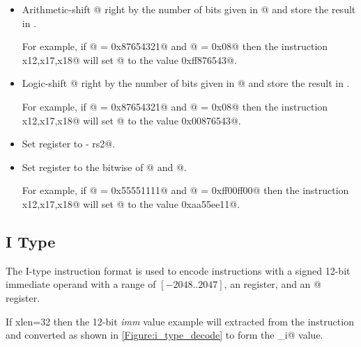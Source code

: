 \begin{itemize}
\item{}
\label{insn:sra}

Arithmetic-shift @ right by the number of bits given in @ and
store the result in \verb@rd@.

For example, if @ = \verb@0x87654321@ and @ = \verb@0x08@
then the instruction \verb@sra x12,x17,x18@ will set @ to the
value \verb@0xff876543@.

\item{}
\label{insn:srl}

Logic-shift @ right by the number of bits given in @ and
store the result in \verb@rd@.

For example, if @ = \verb@0x87654321@ and @ = \verb@0x08@
then the instruction \verb@srl x12,x17,x18@ will set @ to the
value \verb@0x00876543@.

\item{}
\label{insn:sub}

Set register \verb@rd@ to  - rs2@.

\item{}
\label{insn:xor}

Set register \verb@rd@ to the bitwise \verb@xor@ of @ and  @.

For example, if @ = \verb@0x55551111@ and @ = \verb@0xff00ff00@
then the instruction \verb@xor x12,x17,x18@ will set @ to the
value \verb@0xaa55ee11@.

\end{itemize}



\subsection{I Type}
\label{insnformat:itype}

The I-type instruction format is used to encode instructions with a
signed 12-bit immediate operand with a range of $[-2048..2047]$,
an \verb@rd@ register, and an @ register.

If \Gls{xlen}=32 then the 12-bit {\em imm} value example will extracted from 
the instruction and converted as shown in \autoref{Figure:i_type_decode}
to form the \verb@imm_i@ value.

